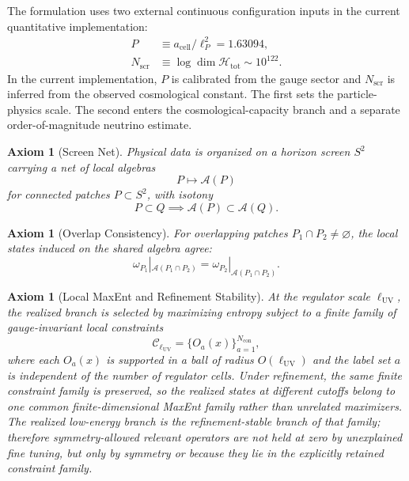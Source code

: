 \documentclass[11pt]{article}
\newtheorem{axiom}[theorem]{Axiom}
\begin{document}
The formulation uses two external continuous configuration inputs in the current quantitative implementation:
\begin{align}
P &\equiv a_{\mathrm{cell}}/\ell_P^2 = 1.63094,\\
N_{\mathrm{scr}} &\equiv \log \dim \mathcal H_{\mathrm{tot}} \sim 10^{122}.
\end{align}
In the current implementation, \(P\) is calibrated from the gauge sector and \(N_{\mathrm{scr}}\) is inferred from the observed cosmological constant. The first sets the particle-physics scale. The second enters the cosmological-capacity branch and a separate order-of-magnitude neutrino estimate.

\begin{axiom}[Screen Net]\label{ax:screen}
Physical data is organized on a horizon screen \(S^2\) carrying a net of local algebras
\[
P \longmapsto \mathcal A(P)
\]
for connected patches \(P\subset S^2\), with isotony
\[
P\subset Q \implies \mathcal A(P)\subset \mathcal A(Q).
\]
\end{axiom}

\begin{axiom}[Overlap Consistency]\label{ax:overlap}
For overlapping patches \(P_1\cap P_2\neq\varnothing\), the local states induced on the shared algebra agree:
\[
\omega_{P_1}|_{\mathcal A(P_1\cap P_2)}
=
\omega_{P_2}|_{\mathcal A(P_1\cap P_2)}.
\]
\end{axiom}

\begin{axiom}[Local MaxEnt and Refinement Stability]\label{ax:maxent}
At the regulator scale \(\ell_{\mathrm{UV}}\), the realized branch is selected by maximizing entropy subject to a finite family of gauge-invariant local constraints
\[
\mathcal C_{\ell_{\mathrm{UV}}}=\{O_a(x)\}_{a=1}^{N_{\mathrm{con}}},
\]
where each \(O_a(x)\) is supported in a ball of radius \(O(\ell_{\mathrm{UV}})\) and the label set \(a\) is independent of the number of regulator cells. Under refinement, the same finite constraint family is preserved, so the realized states at different cutoffs belong to one common finite-dimensional MaxEnt family rather than unrelated maximizers. The realized low-energy branch is the refinement-stable branch of that family; therefore symmetry-allowed relevant operators are not held at zero by unexplained fine tuning, but only by symmetry or because they lie in the explicitly retained constraint family.
\end{axiom}
\end{document}
